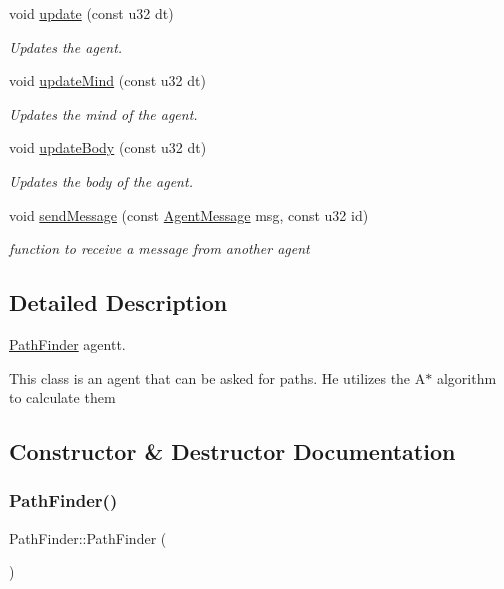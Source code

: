 \begin{DoxyCompactItemize}
void \mbox{\hyperlink{class_path_finder_a45e15457e0f7177c973213cc46722275}{update}} (const u32 dt)
\begin{DoxyCompactList}\small\item\em Updates the agent. \end{DoxyCompactList}\item 
void \mbox{\hyperlink{class_path_finder_a611da8a914a8eebf13af130a6436902a}{update\+Mind}} (const u32 dt)
\begin{DoxyCompactList}\small\item\em Updates the mind of the agent. \end{DoxyCompactList}\item 
void \mbox{\hyperlink{class_path_finder_a4dc676609f38e4809f4b614b2a414235}{update\+Body}} (const u32 dt)
\begin{DoxyCompactList}\small\item\em Updates the body of the agent. \end{DoxyCompactList}\item 
void \mbox{\hyperlink{class_path_finder_afe58142744ff067c1f510efd3478e634}{send\+Message}} (const \mbox{\hyperlink{class_agent_message}{Agent\+Message}} msg, const u32 id)
\begin{DoxyCompactList}\small\item\em function to receive a message from another agent \end{DoxyCompactList}\end{DoxyCompactItemize}


\subsection{Detailed Description}
\mbox{\hyperlink{class_path_finder}{Path\+Finder}} agentt. 

This class is an agent that can be asked for paths. He utilizes the A$\ast$ algorithm to calculate them 

\subsection{Constructor \& Destructor Documentation}
\mbox{\label{class_path_finder_a0761f248c1ebaacf3e47a4021ca25256}} 
\subsubsection{\texorpdfstring{Path\+Finder()}{PathFinder()}}
{\footnotesize\ttfamily Path\+Finder\+::\+Path\+Finder (\begin{DoxyParamCaption}{ }\end{DoxyParamCaption})}



